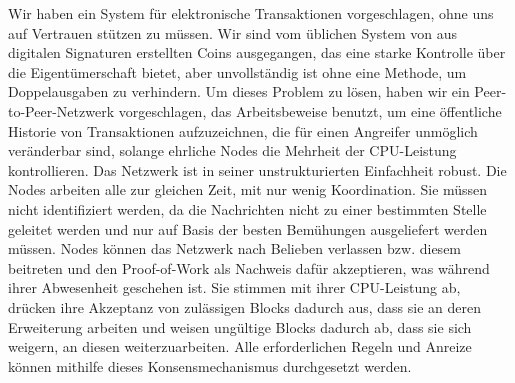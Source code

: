 \documentclass[9pt]{article}
\begin{document}
	Wir haben ein System für elektronische Transaktionen vorgeschlagen, ohne uns auf Vertrauen stützen zu müssen. Wir sind vom üblichen System von aus digitalen Signaturen erstellten Coins ausgegangen, das eine starke Kontrolle über die Eigentümerschaft bietet, aber unvollständig ist ohne eine Methode, um Doppelausgaben zu verhindern. Um dieses Problem zu lösen, haben wir ein Peer-to-Peer-Netzwerk vorgeschlagen, das Arbeitsbeweise benutzt, um eine öffentliche Historie von Transaktionen aufzuzeichnen, die für einen Angreifer unmöglich veränderbar sind, solange ehrliche Nodes die Mehrheit der CPU-Leistung kontrollieren. Das Netzwerk ist in seiner unstrukturierten Einfachheit robust. Die Nodes arbeiten alle zur gleichen Zeit, mit nur wenig Koordination. Sie müssen nicht identifiziert werden, da die Nachrichten nicht zu einer bestimmten Stelle geleitet werden und nur auf Basis der besten Bemühungen ausgeliefert werden müssen. Nodes können das Netzwerk nach Belieben verlassen bzw. diesem beitreten und den Proof-of-Work als Nachweis dafür akzeptieren, was während ihrer Abwesenheit geschehen ist. Sie stimmen mit ihrer CPU-Leistung ab, drücken ihre Akzeptanz von zulässigen Blocks dadurch aus, dass sie an deren Erweiterung arbeiten und weisen ungültige Blocks dadurch ab, dass sie sich weigern, an diesen weiterzuarbeiten. Alle erforderlichen Regeln und Anreize können mithilfe dieses Konsensmechanismus durchgesetzt werden.
	
	\newpage
	
\end{document}
